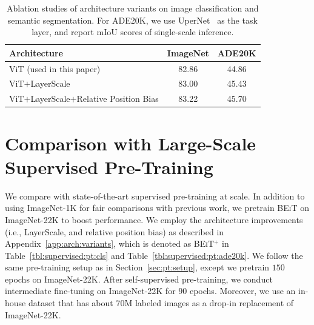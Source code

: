 \documentclass{article}
\newcommand\our{\textsc{BEiT}}
\begin{document}
\begin{table}[H]
\centering
\begin{tabular}{lcc}
\toprule
\textbf{Architecture} & \bf ImageNet & \bf ADE20K \\ \midrule
ViT (used in this paper) & 82.86 & 44.86 \\ 
ViT$+$LayerScale & 83.00 & 45.43 \\
ViT$+$LayerScale$+$Relative Position Bias & 83.22 & 45.70 \\
\bottomrule
\end{tabular}
\caption{
Ablation studies of architecture variants on image classification and semantic segmentation.
For ADE20K, we use UperNet~\citep{upernet} as the task layer, and report mIoU scores of single-scale inference.
}
\label{tbl:arch_ablation}
\end{table}


\section{Comparison with Large-Scale Supervised Pre-Training}
\label{app:cmp:supervised:pt}

We compare with state-of-the-art supervised pre-training at scale.
In addition to using ImageNet-1K for fair comparisons with previous work, we pretrain \our{} on ImageNet-22K to boost performance.
We employ the architecture improvements (i.e., LayerScale, and relative position bias) as described in Appendix~\ref{app:arch:variants}, which is denoted as \our{}$^+$ in Table~\ref{tbl:supervised:pt:cls} and Table~\ref{tbl:supervised:pt:ade20k}.
We follow the same pre-training setup as in Section~\ref{sec:pt:setup}, except we pretrain $150$ epochs on ImageNet-22K.
After self-supervised pre-training, we conduct intermediate fine-tuning on ImageNet-22K for $90$ epochs.
Moreover, we use an in-house dataset that has about 70M labeled images as a drop-in replacement of ImageNet-22K.
\end{document}
